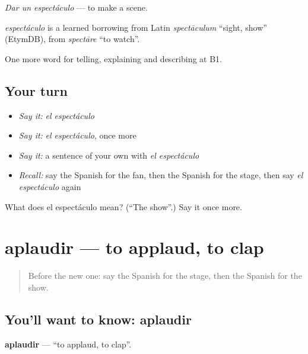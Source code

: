 \emph{Dar un espectáculo} — to make a scene.

\begin{cousinweb}
\emph{espectáculo} is a learned borrowing from Latin \emph{spectāculum} \textquotedblleft{}sight, show\textquotedblright{} (EtymDB), from \emph{spectāre} \textquotedblleft{}to watch\textquotedblright{}.
\end{cousinweb}

\begin{grammarlens}[title={What you've built}]
One more word for telling, explaining and describing at B1.
\end{grammarlens}

\subsection*{Your turn}
\begin{itemize}
\raggedright
  \item \emph{Say it:} \emph{el espectáculo}
  \item \emph{Say it:} \emph{el espectáculo}, once more
  \item \emph{Say it:} a sentence of your own with \emph{el espectáculo}
  \item \emph{Recall:} say the Spanish for the fan, then the Spanish for the stage, then say \emph{el espectáculo} again
\end{itemize}

\begin{tcolorbox}[breakable,colback=teal!4,colframe=teal!35!black,title={Before you move on}]
What does el espectáculo mean? (\textquotedblleft{}The show\textquotedblright{}.) Say it once more.
\end{tcolorbox}
\section[aplaudir]{aplaudir — to applaud, to clap}

\label{lesson:ES-C759-aplaudir}



\begin{quote}
Before the new one: say the Spanish for the stage, then the Spanish for the show.
\end{quote}

\subsection*{You'll want to know: aplaudir}
\textbf{aplaudir} — \textquotedblleft{}to applaud, to clap\textquotedblright{}.


